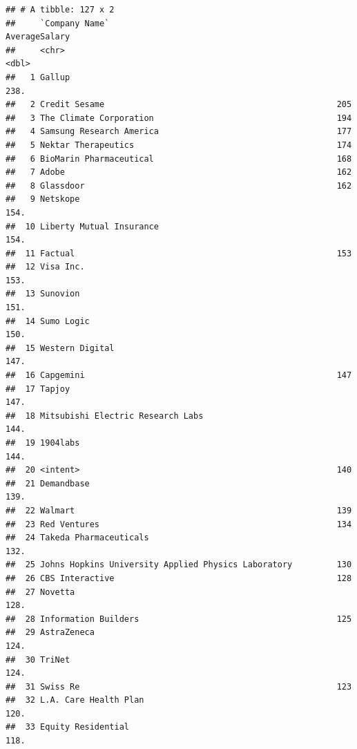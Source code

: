 \documentclass[
]{article}
\begin{document}
\begin{verbatim}
## # A tibble: 127 x 2
##     `Company Name`                                      AverageSalary
##     <chr>                                                       <dbl>
##   1 Gallup                                                      238. 
##   2 Credit Sesame                                               205  
##   3 The Climate Corporation                                     194  
##   4 Samsung Research America                                    177  
##   5 Nektar Therapeutics                                         174  
##   6 BioMarin Pharmaceutical                                     168  
##   7 Adobe                                                       162  
##   8 Glassdoor                                                   162  
##   9 Netskope                                                    154. 
##  10 Liberty Mutual Insurance                                    154. 
##  11 Factual                                                     153  
##  12 Visa Inc.                                                   153. 
##  13 Sunovion                                                    151. 
##  14 Sumo Logic                                                  150. 
##  15 Western Digital                                             147. 
##  16 Capgemini                                                   147  
##  17 Tapjoy                                                      147. 
##  18 Mitsubishi Electric Research Labs                           144. 
##  19 1904labs                                                    144. 
##  20 <intent>                                                    140  
##  21 Demandbase                                                  139. 
##  22 Walmart                                                     139  
##  23 Red Ventures                                                134  
##  24 Takeda Pharmaceuticals                                      132. 
##  25 Johns Hopkins University Applied Physics Laboratory         130  
##  26 CBS Interactive                                             128  
##  27 Novetta                                                     128. 
##  28 Information Builders                                        125  
##  29 AstraZeneca                                                 124. 
##  30 TriNet                                                      124. 
##  31 Swiss Re                                                    123  
##  32 L.A. Care Health Plan                                       120. 
##  33 Equity Residential                                          118. 

\end{verbatim}
\end{document}
